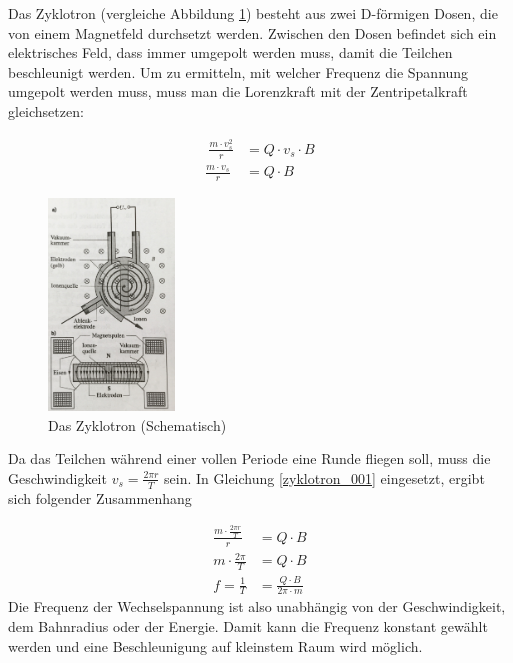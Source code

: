 \documentclass[a4paper]{article}
\begin{document}
			Das Zyklotron (vergleiche Abbildung \ref{img:aufbau_zyklotron}) besteht aus zwei D-förmigen Dosen, die von einem Magnetfeld durchsetzt werden. Zwischen den Dosen befindet sich ein elektrisches Feld, dass immer umgepolt werden muss, damit die Teilchen beschleunigt werden. Um zu ermitteln, mit welcher Frequenz die Spannung umgepolt werden muss, muss man die Lorenzkraft mit der Zentripetalkraft gleichsetzen:
			
			\begin{equation}\label{zyklotron_001}
				\begin{aligned}\
				\frac{m\cdot v_s^2}{r} &= Q \cdot v_s\cdot B\\
				\frac{m\cdot v_s}{r} &= Q \cdot B
				\end{aligned}
			\end{equation}
			
						\begin{figure}[H]
				\centering
				\includegraphics[width=0.3\textwidth]{img/aufbau_zyklotron.jpg}
				\caption{Das Zyklotron (Schematisch)}
				\label{img:aufbau_zyklotron}
			\end{figure}
			
			\noindent Da das Teilchen während einer vollen Periode eine Runde fliegen soll, muss die Geschwindigkeit $v_s = \frac{2\pi r}{T}$ sein. In Gleichung \ref{zyklotron_001} eingesetzt, ergibt sich folgender Zusammenhang
			
			\begin{equation}
				\begin{aligned}
				\frac{m\cdot \frac{2\pi r}{T}}{r} &= Q \cdot B\\
				m\cdot \frac{2\pi}{T} &= Q \cdot B\\
				f= \frac{1}{T} &= \frac{Q \cdot B}{2\pi\cdot m  }
				\end{aligned}
			\end{equation}
			Die Frequenz der Wechselspannung ist also unabhängig von der Geschwindigkeit, dem Bahnradius oder der Energie. Damit kann die Frequenz konstant gewählt werden und eine Beschleunigung auf kleinstem Raum wird möglich.
			
\end{document}
